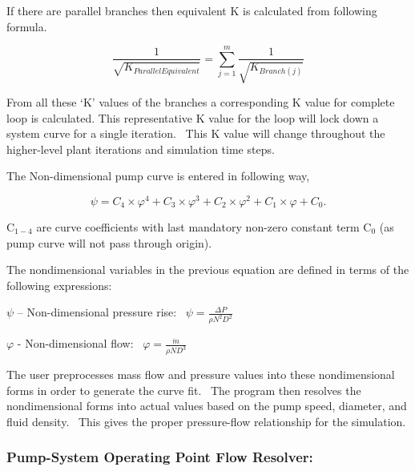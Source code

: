 If there are parallel branches then equivalent K is calculated from following formula.

\begin{equation}
\frac{1}{{\sqrt {{K_{ParallelEquivalent}}} }} = \sum\limits_{j = 1}^m {\frac{1}{{\sqrt {{K_{Branch(j)}}} }}}
\end{equation}

From all these `K' values of the branches a corresponding K value for complete loop is calculated. This representative K value for the loop will lock down a system curve for a single iteration.~ This K value will change throughout the higher-level plant iterations and simulation time steps.

The Non-dimensional pump curve is entered in following way,

\begin{equation}
\psi  = {C_4} \times {\varphi ^4} + {C_3} \times {\varphi ^3} + {C_2} \times {\varphi ^2} + {C_1} \times \varphi  + {C_0}.
\end{equation}

C\(_{1-4}\) are curve coefficients with last mandatory non-zero constant term C\(_{0}\) (as pump curve will not pass through origin).

The nondimensional variables in the previous equation are defined in terms of the following expressions:

$\psi$ -- Non-dimensional pressure rise:~ \(\psi = \frac{{\Delta P}}{{\rho {N^2}{D^2}}}\)

$\varphi$ - Non-dimensional flow:~ \(\varphi = \frac{{\dot m}}{{\rho N{D^3}}}\)

The user preprocesses mass flow and pressure values into these nondimensional forms in order to generate the curve fit.~ The program then resolves the nondimensional forms into actual values based on the pump speed, diameter, and fluid density.~ This gives the proper pressure-flow relationship for the simulation.

\subsubsection{Pump-System Operating Point Flow Resolver:}\label{pump-system-operating-point-flow-resolver}


